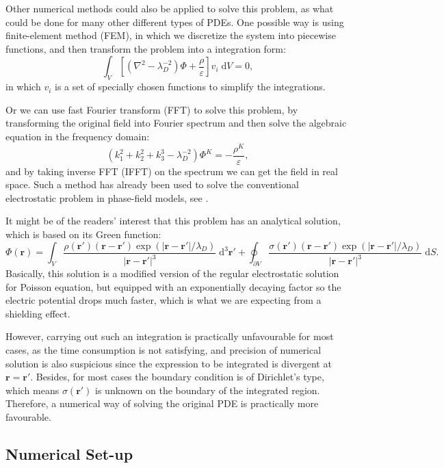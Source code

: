 \documentclass{article}
\begin{document}
\begin{spacing}{1.1}
Other numerical methods could also be applied to solve this problem, as what could be done for many other different types of PDEs. One possible way is using finite-element method (FEM), in which we discretize the system into piecewise functions, and then transform the problem into a integration form:
\[\int_V\left[(\nabla^2-\lambda_D^{-2})\Phi+\frac{\rho}{\varepsilon}\right]v_i\;\mathrm{d}V=0,\]
in which $v_i$ is a set of specially chosen functions to simplify the integrations.

Or we can use fast Fourier transform (FFT) to solve this problem, by transforming the original field into Fourier spectrum and then solve the algebraic equation in the frequency domain:
\[(k_1^2+k_2^2+k_3^3-\lambda_D^{-2})\Phi^K=-\frac{\rho^K}{\varepsilon},\]
and by taking inverse FFT (IFFT) on the spectrum we can get the field in real space. Such a method has already been used to solve the conventional electrostatic problem in phase-field models, see \citep{li2002}.

It might be of the readers' interest that this problem has an analytical solution, which is based on its Green function:
\[ \Phi(\mathbf{r}) =
\int _V \frac{\rho(\mathbf{r'}) (\mathbf{r} - \mathbf{r'}) \exp(|\mathbf{r} - \mathbf{r'}| / \lambda_D)}{|\mathbf{r} - \mathbf{r'}|^3} \;\mathrm{d}^3 \mathbf{r'} +
\oint _{\partial V} \frac{\sigma(\mathbf{r'}) (\mathbf{r} - \mathbf{r'}) \exp(|\mathbf{r} - \mathbf{r'}| / \lambda_D)}{|\mathbf{r} - \mathbf{r'}|^3} \;\mathrm{d} S.\]
Basically, this solution is a modified version of the regular electrostatic solution for Poisson equation, but equipped with an exponentially decaying factor so the electric potential drops much faster, which is what we are expecting from a shielding effect.

However, carrying out such an integration is practically unfavourable for most cases, as the time consumption is not satisfying, and precision of numerical solution is also suspicious since the expression to be integrated is divergent at $\mathbf{r} = \mathbf{r'}$. Besides, for most cases the boundary condition is of Dirichlet's type, which means $\sigma(\mathbf{r'})$ is unknown on the boundary of the integrated region. Therefore, a numerical way of solving the original PDE is practically more favourable.

\subsection{Numerical Set-up}


\end{spacing}
\end{document}

